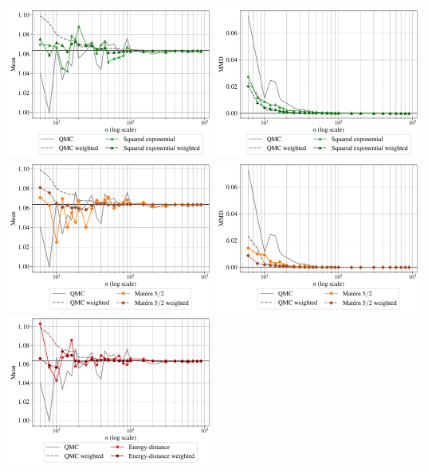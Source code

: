 \begin{figure}[!h]
\begin{center}
    \includegraphics[width=0.48\textwidth]{part2/figures/DCE/analytical_bench/Gaussian Mixture_convergence_SE.pdf}
    \includegraphics[width=0.48\textwidth]{part2/figures/DCE/analytical_bench/Gaussian Mixture_convergence_MMD_SE.pdf}\\
    \includegraphics[width=0.48\textwidth]{part2/figures/DCE/analytical_bench/Gaussian Mixture_convergence_Matern.pdf}
    \includegraphics[width=0.48\textwidth]{part2/figures/DCE/analytical_bench/Gaussian Mixture_convergence_MMD_Matern.pdf}\\
    \includegraphics[width=0.48\textwidth]{part2/figures/DCE/analytical_bench/Gaussian Mixture_convergence_ED.pdf}

\end{center}
\end{figure}

